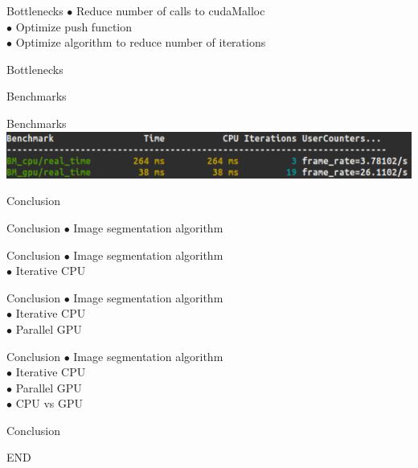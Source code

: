 \documentclass[10pt]{beamer}
\begin{document}
\begin{frame}{Bottlenecks}
$\bullet$ Reduce number of calls to cudaMalloc \\
$\bullet$ Optimize push function \\
$\bullet$ Optimize algorithm to reduce number of iterations \\
\end{frame}

\begin{frame}{Bottlenecks}
\end{frame}

\begin{frame}{Benchmarks}
\end{frame}

\begin{frame}{Benchmarks}
    \includegraphics[width=1\textwidth]{../pics/benchmark02.png}
\end{frame}

\begin{frame}{Conclusion}
\end{frame}

\begin{frame}{Conclusion}
$\bullet$ Image segmentation algorithm
\end{frame}

\begin{frame}{Conclusion}
$\bullet$ Image segmentation algorithm\\
$\bullet$ Iterative CPU
\end{frame}

\begin{frame}{Conclusion}
$\bullet$ Image segmentation algorithm\\
$\bullet$ Iterative CPU\\
$\bullet$ Parallel GPU
\end{frame}


\begin{frame}{Conclusion}
$\bullet$ Image segmentation algorithm\\
$\bullet$ Iterative CPU\\
$\bullet$ Parallel GPU\\
$\bullet$ CPU vs GPU
\end{frame}

\begin{frame}{Conclusion}
\begin{center}
    END
\end{center}
\end{frame}
\end{document}
